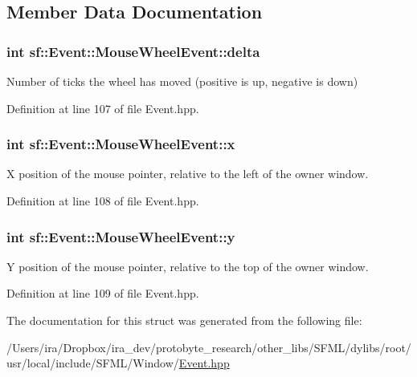 \subsection{Member Data Documentation}
\hypertarget{structsf_1_1_event_1_1_mouse_wheel_event_a4d02b524b5530c7863e7b0f211fa522c}{
\subsubsection[{delta}]{\setlength{\rightskip}{0pt plus 5cm}int sf\-::\-Event\-::\-Mouse\-Wheel\-Event\-::delta}}\label{structsf_1_1_event_1_1_mouse_wheel_event_a4d02b524b5530c7863e7b0f211fa522c}


Number of ticks the wheel has moved (positive is up, negative is down) 



Definition at line 107 of file Event.\-hpp.

\hypertarget{structsf_1_1_event_1_1_mouse_wheel_event_a3079803f836ed7208f43b60332ab053e}{
\subsubsection[{x}]{\setlength{\rightskip}{0pt plus 5cm}int sf\-::\-Event\-::\-Mouse\-Wheel\-Event\-::x}}\label{structsf_1_1_event_1_1_mouse_wheel_event_a3079803f836ed7208f43b60332ab053e}


X position of the mouse pointer, relative to the left of the owner window. 



Definition at line 108 of file Event.\-hpp.

\hypertarget{structsf_1_1_event_1_1_mouse_wheel_event_a7ea1b8d8c28e2f530c6e9e6d9a5d32d3}{
\subsubsection[{y}]{\setlength{\rightskip}{0pt plus 5cm}int sf\-::\-Event\-::\-Mouse\-Wheel\-Event\-::y}}\label{structsf_1_1_event_1_1_mouse_wheel_event_a7ea1b8d8c28e2f530c6e9e6d9a5d32d3}


Y position of the mouse pointer, relative to the top of the owner window. 



Definition at line 109 of file Event.\-hpp.



The documentation for this struct was generated from the following file\-:\begin{DoxyCompactItemize}
\item 
/\-Users/ira/\-Dropbox/ira\-\_\-dev/protobyte\-\_\-research/other\-\_\-libs/\-S\-F\-M\-L/dylibs/root/usr/local/include/\-S\-F\-M\-L/\-Window/\hyperlink{_event_8hpp}{Event.\-hpp}\end{DoxyCompactItemize}

